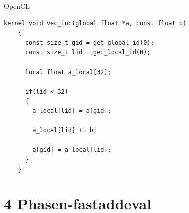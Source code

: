 \documentclass[10pt]{beamer}
\begin{document}
\begin{frame}[fragile]{OpenCL}
  \begin{lstlisting}[style=CStyle]
    kernel void vec_inc(global float *a, const float b)
    {
      const size_t gid = get_global_id(0);
      const size_t lid = get_local_id(0);

      local float a_local[32];

      if(lid < 32)
      {
        a_local[lid] = a[gid];

        a_local[lid] += b;

        a[gid] = a_local[lid];
      }
    }
  \end{lstlisting}
\end{frame}
\section{4 Phasen-fastaddeval}
\end{document}
